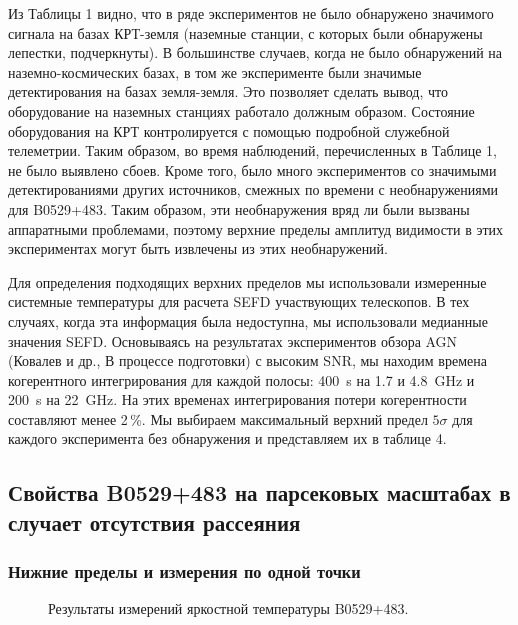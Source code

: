 Из Таблицы 1 видно, что в ряде экспериментов не было обнаружено значимого сигнала на базах
КРТ-земля (наземные станции, с которых были обнаружены лепестки, подчеркнуты). В большинстве
случаев, когда не было обнаружений на наземно-космических базах, в том же эксперименте были
значимые детектирования на базах земля-земля. Это позволяет сделать вывод, что
оборудование на наземных станциях работало должным образом. Состояние оборудования на КРТ
контролируется с помощью подробной служебной телеметрии. Таким образом, во время наблюдений,
перечисленных в Таблице 1, не было выявлено сбоев. Кроме того, было много экспериментов со
значимыми детектированиями других источников, смежных по времени с необнаружениями для B0529+483.
Таким образом, эти необнаружения вряд ли были вызваны аппаратными проблемами, поэтому верхние
пределы амплитуд видимости в этих экспериментах могут быть извлечены из этих необнаружений.

Для определения подходящих верхних пределов мы использовали измеренные системные температуры
для расчета SEFD участвующих телескопов. В тех случаях, когда эта информация была
недоступна, мы использовали медианные значения SEFD. Основываясь на результатах экспериментов
обзора AGN (Ковалев и др., В процессе подготовки) с высоким SNR, мы находим времена
когерентного интегрирования для каждой полосы: \SI{400}{\second} на 1.7 и \SI{4.8}{\GHz} и
\SI{200}{\second} на \SI{22}{\GHz}. На этих временах интегрирования потери когерентности составляют
менее 2\,\%. Мы выбираем максимальный верхний предел $5\sigma$ для каждого эксперимента без
обнаружения и представляем их в таблице 4.

\subsection{Свойства B0529+483 на парсековых масштабах в случает отсутствия рассеяния}

\subsubsection{Нижние пределы и измерения по одной точки}

\begin{figure}[tbh]
\caption{Результаты измерений яркостной температуры B0529+483.}
\label{fig:0529_tb}
\end{figure}

